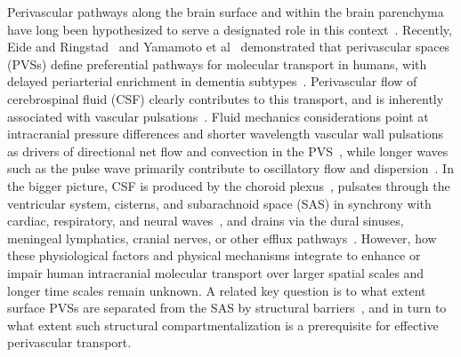 \documentclass[fleqn,10pt]{wlscirep}
\begin{document}
Perivascular pathways along the brain surface and within the brain
parenchyma have long been hypothesized to serve a designated role in
this context~\cite{rennels1985evidence, zhang1990interrelationships,
  ichimura1991distribution, carare2008solutes, iliff2012paravascular,
  foley2012realtime, hannocks2018molecular, van2024caa}. Recently, Eide and
Ringstad~\cite{eide2024functional} and Yamamoto et
al~\cite{yamamoto2024perivascular} demonstrated that perivascular
spaces (PVSs) define preferential pathways for molecular transport in
humans, with delayed periarterial enrichment in dementia
subtypes~\cite{eide2024functional}. Perivascular flow of cerebrospinal
fluid (CSF) clearly contributes to this transport, and is inherently
associated with vascular pulsations~\cite{hadaczek2006perivascular,
  iliff2013cerebral, bedussi2018paravascular, mestre2018flow,
  boster2023artificial, hirschler2024region}. Fluid mechanics
considerations point at intracranial pressure differences and shorter
wavelength vascular wall pulsations as drivers of directional net flow
and convection in the PVS~\cite{bilston2003arterial, rey2018pulsatile,
  daversin2020mechanisms, kedarasetti2020functional,
  gjerde2023directional, nozaleda2024arterial}, while longer waves
such as the pulse wave primarily contribute to oscillatory flow and
dispersion~\cite{asgari2016glymphatic, sharp2019dispersion, thomas2019fluid,
  kedarasetti2020arterial, troyetsky2021dispersion, 
  martinac2021phase}. In the bigger picture, CSF is produced by the
choroid plexus~\cite{damkier2013cerebrospinal,
  steffensen2018cotransporter, liu2020direct}, pulsates through the
ventricular system, cisterns, and subarachnoid space (SAS) in
synchrony with cardiac, respiratory, and neural
waves~\cite{greitz1993pulsatile, wagshul2011pulsating,
  sweetman2011cerebrospinal, fultz2019coupled, vinje2019respiratory,
  eide2021direction, causemann2022human, williams2023neural,
  zimmermann2023total}, and drains via the dural sinuses, meningeal
lymphatics, cranial nerves, or other efflux
pathways~\cite{proulx2021cerebrospinal}. However, how these
physiological factors and physical mechanisms integrate to enhance or
impair human intracranial molecular transport over larger spatial
scales and longer time scales remain unknown. A related key question
is to what extent surface PVSs are separated from the SAS by
structural barriers~\cite{zhang1990interrelationships,
  weller2005microscopic, bedussi2017paravascular,
  pizzo2018intrathecal, mestre2022periarteriolar,
  mollgard2023mesothelium, smets2024perivascular, eide2024functional},
and in turn to what extent such structural compartmentalization is a
prerequisite for effective perivascular transport.
 
\end{document}
